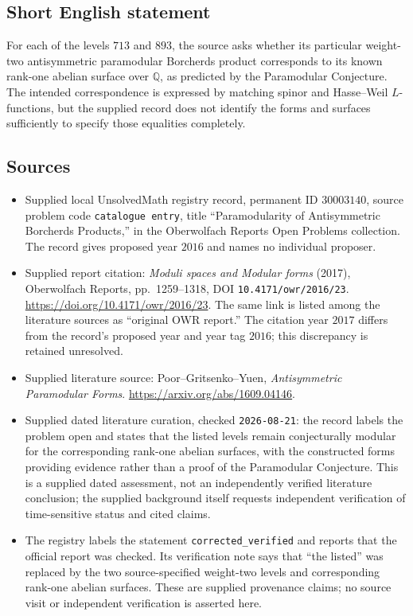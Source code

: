 \documentclass[11pt]{article}
\newcommand{\Q}{\mathbb{Q}}
\begin{document}
\subsection{Short English statement}
For each of the levels \(713\) and \(893\), the source asks whether its particular weight-two antisymmetric paramodular Borcherds product corresponds to its known rank-one abelian surface over \(\Q\), as predicted by the Paramodular Conjecture. The intended correspondence is expressed by matching spinor and Hasse--Weil \(L\)-functions, but the supplied record does not identify the forms and surfaces sufficiently to specify those equalities completely.
\subsection{Sources}
\begin{itemize}
\item Supplied local UnsolvedMath registry record, permanent ID \(30003140\), source problem code \texttt{catalogue entry}, title ``Paramodularity of Antisymmetric Borcherds Products,'' in the Oberwolfach Reports Open Problems collection. The record gives proposed year \(2016\) and names no individual proposer.
\item Supplied report citation: \emph{Moduli spaces and Modular forms} (2017), Oberwolfach Reports, pp.~1259--1318, DOI \texttt{10.4171/owr/2016/23}. \url{https://doi.org/10.4171/owr/2016/23}. The same link is listed among the literature sources as ``original OWR report.'' The citation year \(2017\) differs from the record's proposed year and year tag \(2016\); this discrepancy is retained unresolved.
\item Supplied literature source: Poor--Gritsenko--Yuen, \emph{Antisymmetric Paramodular Forms}. \url{https://arxiv.org/abs/1609.04146}.
\item Supplied dated literature curation, checked \texttt{2026-08-21}: the record labels the problem open and states that the listed levels remain conjecturally modular for the corresponding rank-one abelian surfaces, with the constructed forms providing evidence rather than a proof of the Paramodular Conjecture. This is a supplied dated assessment, not an independently verified literature conclusion; the supplied background itself requests independent verification of time-sensitive status and cited claims.
\item The registry labels the statement \texttt{corrected\_verified} and reports that the official report was checked. Its verification note says that ``the listed'' was replaced by the two source-specified weight-two levels and corresponding rank-one abelian surfaces. These are supplied provenance claims; no source visit or independent verification is asserted here.
\end{itemize}
\end{document}
